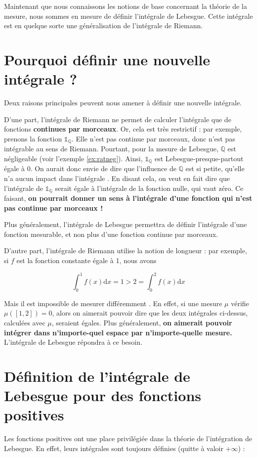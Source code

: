 \documentclass[../integ-proba.tex]{subfiles}
\begin{document}
Maintenant que nous connaissons les notions de base concernant la théorie de la mesure, nous sommes en mesure de définir l'intégrale de Lebesgue.
Cette intégrale est en quelque sorte une généralisation de l'intégrale de Riemann.

\section{Pourquoi définir une nouvelle intégrale ?}

Deux raisons principales peuvent nous amener à définir une nouvelle intégrale.

D'une part, l'intégrale de Riemann ne permet de calculer l'intégrale que de fonctions \textbf{continues par morceaux}.
Or, cela est très restrictif : par exemple, prenons la fonction $\mathds{1}_{\mathbb{Q}}$.
Elle n'est pas continue par morceaux, donc n'est pas intégrable au sens de Riemann.
Pourtant, pour la mesure de Lebesgue, $\mathbb{Q}$ est négligeable (voir l'exemple \ref{ex:ratneg}).
Ainsi, $\mathds{1}_{\mathbb{Q}}$ est Lebesgue-presque-partout égale à $0$.
On aurait donc envie de dire que \og l'influence de $\mathbb{Q}$ est si petite, qu'elle n'a aucun impact dans l'intégrale \fg.
En disant cela, on veut en fait dire que l'intégrale de $\mathds{1}_{\mathbb{Q}}$ serait égale à l'intégrale de la fonction nulle, qui vaut zéro.
Ce faisant, \textbf{on pourrait donner un sens à l'intégrale d'une fonction qui n'est pas continue par morceaux !}

Plus généralement, l'intégrale de Lebesgue permettra de définir l'intégrale d'une fonction mesurable, et non plus d'une fonction continue par morceaux.

D'autre part, l'intégrale de Riemann utilise la notion de longueur :
par exemple, si $f$ est la fonction constante égale à 1, nous avons

$$
\int_0^1f(x)\text{d}x = 1 > 2 = \int_0^2f(x)\text{d}x
$$

Mais il est impossible de \og mesurer différemment \fg.
En effet, si une mesure $\mu$ vérifie $\mu\left(\left[1,2\right]\right)=0$, alors on aimerait pouvoir dire que les deux intégrales ci-dessus, calculées avec $\mu$, seraient égales.
Plus généralement, \textbf{on aimerait pouvoir intégrer dans n'importe-quel espace par n'importe-quelle mesure.}
L'intégrale de Lebesgue répondra à ce besoin.

\section{Définition de l'intégrale de Lebesgue pour des fonctions positives}
\label{sect:defintpos}
Les fonctions positives ont une place privilégiée dans la théorie de l'intégration de Lebesgue.
En effet, leurs intégrales sont toujours définies (quitte à valoir $+\infty$) :
\end{document}
